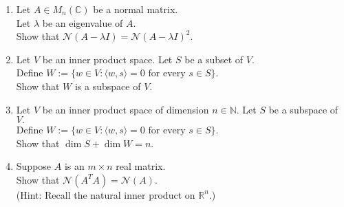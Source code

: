 \documentclass[12pt]{article}
\begin{document}
\begin{enumerate}[leftmargin=*]
	\item Let $A \in M_n(\mathbb{C})$ be a normal matrix.\\
	Let $\lambda$ be an eigenvalue of $A.$\\
	Show that $\mathcal{N}(A - \lambda I) = \mathcal{N}(A - \lambda I)^2.$
	\item Let $V$ be an inner product space. Let $S$ be a subset of $V.$\\
	Define $W := \{w \in V : \langle w, s\rangle = 0 \text{ for every } s \in S\}.$\\
	Show that $W$ is a subspace of $V.$
	\item Let $V$ be an inner product space of dimension $n \in \mathbb{N}.$ Let $S$ be a subspace of $V.$\\
	Define $W := \{w \in V : \langle w, s\rangle = 0 \text{ for every } s \in S\}.$\\
	Show that $\dim S + \dim W = n.$
	\item Suppose $A$ is an $m \times n$ real matrix.\\
	Show that $\mathcal{N}(A^TA) = \mathcal{N}(A).$\\
	(Hint: Recall the natural inner product on $\mathbb{R}^n.$)
\end{enumerate}
\end{document}
